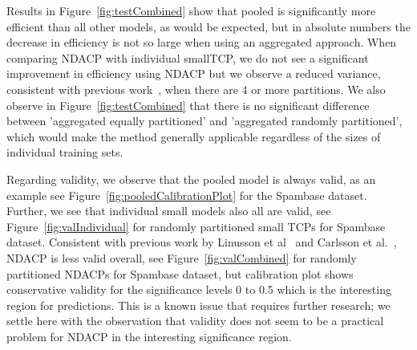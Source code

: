 \documentclass[main]{subfiles}
\begin{document}
Results in Figure~\ref{fig:testCombined} show that pooled is significantly more efficient than all other models, as would be expected, but in absolute numbers the decrease in efficiency is not so large when using an aggregated approach. When comparing NDACP with individual smallTCP, we do not see a significant improvement in efficiency using NDACP but we observe a reduced variance, consistent with previous work~\cite{Carlsson:2014qr}, when there are 4 or more partitions. We also observe in Figure~\ref{fig:testCombined} that there is no significant difference between 'aggregated equally partitioned' and 'aggregated randomly partitioned', which would make the method generally applicable regardless of the sizes of individual training sets.


Regarding validity, we observe that the pooled model is always valid, as an example see Figure~\ref{fig:pooledCalibrationPlot} for the Spambase dataset. Further, we see that individual small models also all are valid, see Figure~\ref{fig:valIndividual} for randomly partitioned small TCPs for Spambase dataset. Consistent with previous work by Linusson et al~\cite{Linusson:2017dn} and Carlsson et al.~\cite{Carlsson:2014qr}, NDACP is less valid overall, see Figure~\ref{fig:valCombined} for randomly partitioned NDACPs for Spambase dataset, but calibration plot shows conservative validity for the significance levels 0 to 0.5 which is the interesting region for predictions. This is a known issue that requires further research; we settle here with the observation that validity does not seem to be a practical problem for NDACP in the interesting significance region.
\end{document}
